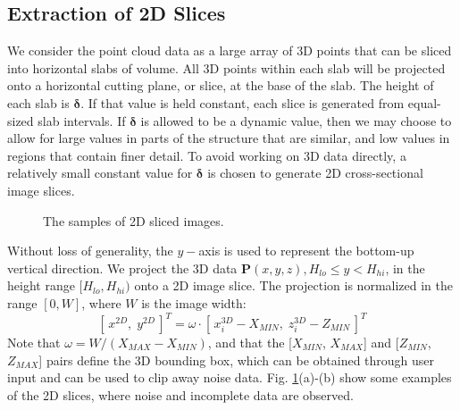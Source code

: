 \documentclass{llncs}
\begin{document}
\subsection{Extraction of 2D Slices}
\label{sec_image_slicing}
We consider the point cloud data as a large array of 3D points that can be
sliced into horizontal slabs of volume.
All 3D points within each slab will be projected onto a horizontal cutting
plane, or slice, at the base of the slab.
The height of each slab is $\boldsymbol{\delta}$.
If that value is held constant, each slice is generated from equal-sized
slab intervals.
If $\boldsymbol{\delta}$ is allowed to be a dynamic value, then we may
choose to allow for large values in parts of the structure that are similar,
and low values in regions that contain finer detail.
To avoid working on 3D data directly, a relatively small constant value
for $\boldsymbol{\delta}$ is chosen to generate 2D cross-sectional image slices.

\begin{figure} [!btp]
  \caption{
The samples of 2D sliced images.
}
  \label{fig_slicing}
\end{figure}

Without loss of generality, the $y-$axis is used to represent the bottom-up
vertical direction.
We project the 3D data
$\boldsymbol{P}(x,y,z), H_{lo} \leq y < H_{hi}$, in the height range
$[H_{lo}, H_{hi})$ onto a 2D image slice.
The projection is normalized in the range $[0,W]$,
where $W$ is the image width:
\begin{equation}\label{eq_image_slicing}
[\,x^{2D},\; y^{2D}\,]^T = \omega\cdot[\,x^{3D}_i - X_{MIN},\; z^{3D}_i - Z_{MIN}\,]^T
\end{equation}
Note that $\omega = W/(X_{MAX} - X_{MIN})$, and that
the [$X_{MIN}$, $X_{MAX}$] and [$Z_{MIN}$, $Z_{MAX}$] pairs define the
3D bounding box, which can be obtained through user input and can be used
to clip away noise data. Fig. \ref{fig_slicing}(a)-(b) show some examples of the
2D slices, where noise and incomplete data are observed.
\end{document}
